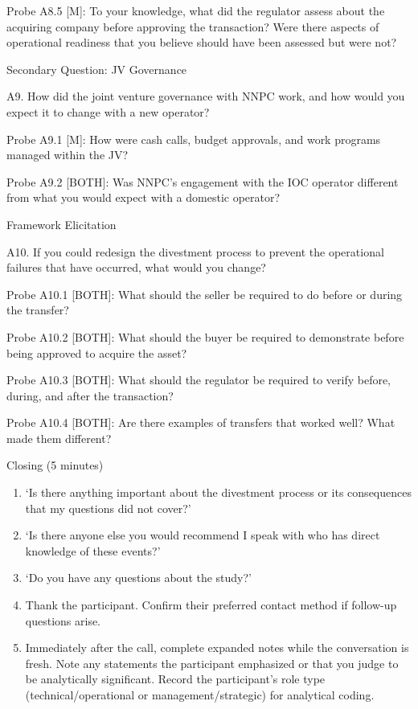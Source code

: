 \documentclass[twoside,fontset=lmodern]{mitthesis}
\begin{document}
Probe A8.5 {[}M{]}: To your knowledge, what did the regulator assess
about the acquiring company before approving the transaction? Were there
aspects of operational readiness that you believe should have been
assessed but were not?

Secondary Question: JV Governance

A9. How did the joint venture governance with NNPC work, and how would
you expect it to change with a new operator?

Probe A9.1 {[}M{]}: How were cash calls, budget approvals, and work
programs managed within the JV?

Probe A9.2 {[}BOTH{]}: Was NNPC's engagement with the IOC operator
different from what you would expect with a domestic operator?

Framework Elicitation

A10. If you could redesign the divestment process to prevent the
operational failures that have occurred, what would you change?

Probe A10.1 {[}BOTH{]}: What should the seller be required to do before
or during the transfer?

Probe A10.2 {[}BOTH{]}: What should the buyer be required to demonstrate
before being approved to acquire the asset?

Probe A10.3 {[}BOTH{]}: What should the regulator be required to verify
before, during, and after the transaction?

Probe A10.4 {[}BOTH{]}: Are there examples of transfers that worked
well? What made them different?

Closing (5 minutes)

\begin{enumerate}
\def\labelenumi{\arabic{enumi}.}
\item
  `Is there anything important about the divestment process or its
  consequences that my questions did not cover?'
\item
  `Is there anyone else you would recommend I speak with who has direct
  knowledge of these events?'
\item
  `Do you have any questions about the study?'
\item
  Thank the participant. Confirm their preferred contact method if
  follow-up questions arise.
\item
  Immediately after the call, complete expanded notes while the
  conversation is fresh. Note any statements the participant emphasized
  or that you judge to be analytically significant. Record the
  participant's role type (technical/operational or
  management/strategic) for analytical coding.
\end{enumerate}
\end{document}
